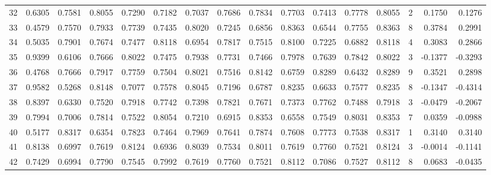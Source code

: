 \begin{tabular}{lrrrrrrrrrrrrrrr}
32  &      0.6305 &  0.7581 &  0.8055 &  0.7290 &  0.7182 &  0.7037 &  0.7686 &  0.7834 &  0.7703 &  0.7413 &   0.7778 &     0.8055 &      2 &                    0.1750 &                     0.1276 \\
33  &      0.4579 &  0.7570 &  0.7933 &  0.7739 &  0.7435 &  0.8020 &  0.7245 &  0.6856 &  0.8363 &  0.6544 &   0.7755 &     0.8363 &      8 &                    0.3784 &                     0.2991 \\
34  &      0.5035 &  0.7901 &  0.7674 &  0.7477 &  0.8118 &  0.6954 &  0.7817 &  0.7515 &  0.8100 &  0.7225 &   0.6882 &     0.8118 &      4 &                    0.3083 &                     0.2866 \\
35  &      0.9399 &  0.6106 &  0.7666 &  0.8022 &  0.7475 &  0.7938 &  0.7731 &  0.7466 &  0.7978 &  0.7639 &   0.7842 &     0.8022 &      3 &                   -0.1377 &                    -0.3293 \\
36  &      0.4768 &  0.7666 &  0.7917 &  0.7759 &  0.7504 &  0.8021 &  0.7516 &  0.8142 &  0.6759 &  0.8289 &   0.6432 &     0.8289 &      9 &                    0.3521 &                     0.2898 \\
37  &      0.9582 &  0.5268 &  0.8148 &  0.7077 &  0.7578 &  0.8045 &  0.7196 &  0.6787 &  0.8235 &  0.6633 &   0.7577 &     0.8235 &      8 &                   -0.1347 &                    -0.4314 \\
38  &      0.8397 &  0.6330 &  0.7520 &  0.7918 &  0.7742 &  0.7398 &  0.7821 &  0.7671 &  0.7373 &  0.7762 &   0.7488 &     0.7918 &      3 &                   -0.0479 &                    -0.2067 \\
39  &      0.7994 &  0.7006 &  0.7814 &  0.7522 &  0.8054 &  0.7210 &  0.6915 &  0.8353 &  0.6558 &  0.7549 &   0.8031 &     0.8353 &      7 &                    0.0359 &                    -0.0988 \\
40  &      0.5177 &  0.8317 &  0.6354 &  0.7823 &  0.7464 &  0.7969 &  0.7641 &  0.7874 &  0.7608 &  0.7773 &   0.7538 &     0.8317 &      1 &                    0.3140 &                     0.3140 \\
41  &      0.8138 &  0.6997 &  0.7619 &  0.8124 &  0.6936 &  0.8039 &  0.7534 &  0.8011 &  0.7619 &  0.7760 &   0.7521 &     0.8124 &      3 &                   -0.0014 &                    -0.1141 \\
42  &      0.7429 &  0.6994 &  0.7790 &  0.7545 &  0.7992 &  0.7619 &  0.7760 &  0.7521 &  0.8112 &  0.7086 &   0.7527 &     0.8112 &      8 &                    0.0683 &                    -0.0435 \\

\end{tabular}
